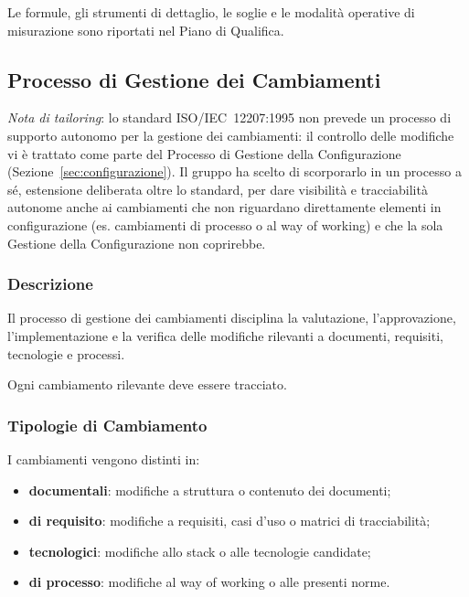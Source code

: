 Le formule, gli strumenti di dettaglio, le soglie e le modalità operative di
misurazione sono riportati nel Piano di Qualifica.


\subsection{Processo di Gestione dei Cambiamenti}
\label{sec:cambiamenti}

\textit{Nota di tailoring}: lo standard ISO/IEC~12207:1995 non prevede un
processo di supporto autonomo per la gestione dei cambiamenti: il controllo
delle modifiche vi è trattato come parte del Processo di Gestione della
Configurazione (Sezione~\ref{sec:configurazione}). Il gruppo ha scelto di
scorporarlo in un processo a sé, estensione deliberata oltre lo standard, per
dare visibilità e tracciabilità autonome anche ai cambiamenti che non
riguardano direttamente elementi in configurazione (es. cambiamenti di
processo o al way of working) e che la sola Gestione della Configurazione non
coprirebbe.

\subsubsection{Descrizione}

Il processo di gestione dei cambiamenti disciplina la valutazione, l'approvazione,
l'implementazione e la verifica delle modifiche rilevanti a documenti, requisiti,
tecnologie e processi.

Ogni cambiamento rilevante deve essere tracciato.


\subsubsection{Tipologie di Cambiamento}

I cambiamenti vengono distinti in:

\begin{itemize}
    \item \textbf{documentali}: modifiche a struttura o contenuto dei documenti;
    \item \textbf{di requisito}: modifiche a requisiti, casi d'uso o matrici di tracciabilità;
    \item \textbf{tecnologici}: modifiche allo stack o alle tecnologie candidate;
    \item \textbf{di processo}: modifiche al way of working o alle presenti norme.
\end{itemize}

